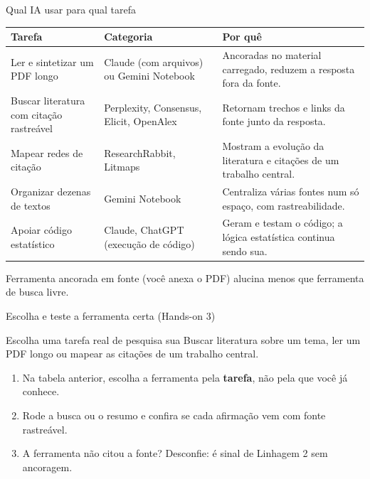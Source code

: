 \documentclass[11pt,aspectratio=169,t]{beamer}
\begin{document}
\begin{frame}{Qual IA usar para qual tarefa}
  \scriptsize
  \renewcommand{\arraystretch}{1.15}
  \begin{tabular}{p{3.0cm} p{2.9cm} p{7.3cm}}
    \toprule
    \textbf{Tarefa} & \textbf{Categoria} & \textbf{Por quê} \\
    \midrule
    Ler e sintetizar um PDF longo & Claude (com arquivos) ou Gemini Notebook & Ancoradas no material carregado, reduzem a resposta fora da fonte. \\
    Buscar literatura com citação rastreável & Perplexity, Consensus, Elicit, OpenAlex & Retornam trechos e links da fonte junto da resposta. \\
    Mapear redes de citação & ResearchRabbit, Litmaps & Mostram a evolução da literatura e citações de um trabalho central. \\
    Organizar dezenas de textos & Gemini Notebook & Centraliza várias fontes num só espaço, com rastreabilidade. \\
    Apoiar código estatístico & Claude, ChatGPT (execução de código) & Geram e testam o código; a lógica estatística continua sendo sua. \\
    \bottomrule
  \end{tabular}
  \pause
  \vspace{0.2cm}
  \begin{exampleblock}{}
    \centering Ferramenta ancorada em fonte (você anexa o PDF) alucina menos que ferramenta de busca livre.
  \end{exampleblock}
\end{frame}

\begin{frame}{Escolha e teste a ferramenta certa (Hands-on 3)}
  \begin{block}{Escolha uma tarefa real de pesquisa sua}
    Buscar literatura sobre um tema, ler um PDF longo ou mapear as citações de um trabalho central.
  \end{block}
  \vfill
  \begin{enumerate}
    \item Na tabela anterior, escolha a ferramenta pela \textbf{tarefa}, não pela que você já conhece.
    \item Rode a busca ou o resumo e confira se cada afirmação vem com fonte rastreável.
    \item A ferramenta não citou a fonte? Desconfie: é sinal de Linhagem 2 sem ancoragem.
  \end{enumerate}
\end{frame}
\end{document}
